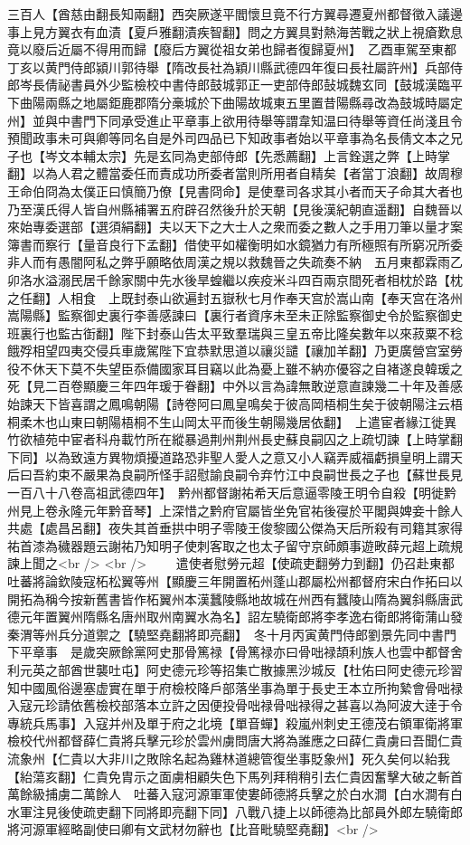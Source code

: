 三百人【酋慈由翻長知兩翻】西突厥遂平閻懷旦竟不行方翼尋遷夏州都督徵入議邊事上見方翼衣有血漬【夏戶雅翻漬疾智翻】問之方翼具對熱海苦戰之狀上視瘡歎息竟以廢后近屬不得用而歸【廢后方翼從祖女弟也歸者復歸夏州】　乙酉車駕至東都　丁亥以黄門侍郎潁川郭待舉【隋改長社為穎川縣武德四年復曰長社屬許州】兵部侍郎岑長倩祕書員外少監檢校中書侍郎鼓城郭正一吏部侍郎鼔城魏玄同【鼓城漢臨平下曲陽兩縣之地屬鉅鹿郡隋分槀城於下曲陽故城東五里置昔陽縣尋改為鼓城時屬定州】並與中書門下同承受進止平章事上欲用待舉等謂韋知温曰待舉等資任尚淺且令預聞政事未可與卿等同名自是外司四品已下知政事者始以平章事為名長倩文本之兄子也【岑文本輔太宗】先是玄同為吏部侍郎【先悉薦翻】上言銓選之弊【上時掌翻】以為人君之體當委任而責成功所委者當則所用者自精矣【者當丁浪翻】故周穆王命伯冏為太僕正曰慎簡乃僚【見書冏命】是使羣司各求其小者而天子命其大者也乃至漢氏得人皆自州縣補署五府辟召然後升於天朝【見後漢紀朝直遥翻】自魏晉以來始專委選部【選須絹翻】夫以天下之大士人之衆而委之數人之手用刀筆以量才案簿書而察行【量音良行下孟翻】借使平如權衡明如水鏡猶力有所極照有所窮况所委非人而有愚闇阿私之弊乎願略依周漢之規以救魏晉之失疏奏不納　五月東都霖雨乙卯洛水溢溺民居千餘家關中先水後旱蝗繼以疾疫米斗四百兩京間死者相枕於路【枕之任翻】人相食　上既封泰山欲遍封五嶽秋七月作奉天宫於嵩山南【奉天宫在洛州嵩陽縣】監察御史裏行李善感諫曰【裏行者資序未至未正除監察御史令於監察御史班裏行也監古衘翻】陛下封泰山告太平致羣瑞與三皇五帝比隆矣數年以來菽粟不稔餓殍相望四夷交侵兵車歲駕陛下宜恭默思道以禳災譴【禳加羊翻】乃更廣營宫室勞役不休天下莫不失望臣忝備國家耳目竊以此為憂上雖不納亦優容之自褚遂良韓瑗之死【見二百卷顯慶三年四年瑗于眷翻】中外以言為諱無敢逆意直諫幾二十年及善感始諫天下皆喜謂之鳳鳴朝陽【詩卷阿曰鳳皇鳴矣于彼高岡梧桐生矣于彼朝陽注云梧桐柔木也山東曰朝陽梧桐不生山岡太平而後生朝陽幾居依翻】　上遣宦者緣江徙異竹欲植苑中宦者科舟載竹所在縱暴過荆州荆州長史蘇良嗣囚之上疏切諫【上時掌翻下同】以為致遠方異物煩擾道路恐非聖人愛人之意又小人竊弄威福虧損皇明上謂天后曰吾約束不嚴果為良嗣所怪手詔慰諭良嗣令弃竹江中良嗣世長之子也【蘇世長見一百八十八卷高祖武德四年】　黔州都督謝祐希天后意逼零陵王明令自殺【明徙黔州見上卷永隆元年黔音琴】上深惜之黔府官屬皆坐免官祐後寑於平閣與婢妾十餘人共處【處昌呂翻】夜失其首垂拱中明子零陵王俊黎國公傑為天后所殺有司籍其家得祐首漆為穢器題云謝祐乃知明子使刺客取之也太子留守京師頗事遊畋薛元超上疏規諫上聞之<br />
<br />
　　遣使者慰勞元超【使疏吏翻勞力到翻】仍召赴東都　吐蕃將論欽陵寇柘松翼等州【顯慶三年開置柘州蓬山郡屬松州都督府宋白作拓曰以開拓為稱今按新舊書皆作柘翼州本漢蠶陵縣地故城在州西有蠶陵山隋為翼斜縣唐武德元年置翼州隋縣名唐州取州南翼水為名】詔左驍衛郎將李孝逸右衛郎將衛蒲山發秦渭等州兵分道禦之【驍堅堯翻將即亮翻】　冬十月丙寅黄門侍郎劉景先同中書門下平章事　是歲突厥餘黨阿史那骨篤禄【骨篤禄亦曰骨咄禄頡利族人也雲中都督舍利元英之部酋世襲吐屯】阿史德元珍等招集亡散據黑沙城反【杜佑曰阿史德元珍習知中國風俗邊塞虚實在單于府檢校降戶部落坐事為單于長史王本立所拘縶會骨咄禄入寇元珍請依舊檢校部落本立許之因便投骨咄禄骨咄禄得之甚喜以為阿波大逹于令專統兵馬事】入寇并州及單于府之北境【單音蟬】殺嵐州刺史王德茂右領軍衛將軍檢校代州都督薛仁貴將兵擊元珍於雲州虜問唐大將為誰應之曰薛仁貴虜曰吾聞仁貴流象州【仁貴以大非川之敗除名起為雞林道總管復坐事貶象州】死久矣何以紿我【紿蕩亥翻】仁貴免胄示之面虜相顧失色下馬列拜稍稍引去仁貴因奮擊大破之斬首萬餘級捕虜二萬餘人　吐蕃入寇河源軍軍使婁師德將兵擊之於白水澗【白水澗有白水軍注見後使疏吏翻下同將即亮翻下同】八戰八捷上以師德為比部員外郎左驍衛郎將河源軍經略副使曰卿有文武材勿辭也【比音毗驍堅堯翻】<br />
